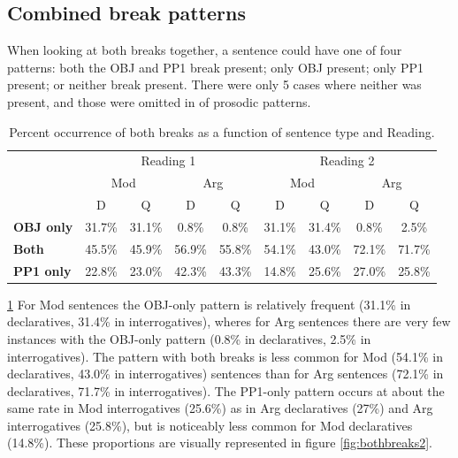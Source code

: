 \documentclass[12pt,oneside]{book}
\begin{document}
\hypertarget{bbr}{%
\subsection{Combined break patterns}\label{bbr}}

When looking at both breaks together, a sentence could have one of four patterns: both the OBJ and PP1 break present; only OBJ present; only PP1 present; or neither break present. There were only 5 cases where neither was present, and those were omitted in  of prosodic patterns.

\begin{table}[!h]

\caption{\label{tab:bothbreaks}Percent occurrence of both breaks as a function of sentence type and Reading.}
\centering
\begin{tabular}{>{\bfseries}lcccccccc}
\toprule
\multicolumn{1}{c}{ } & \multicolumn{4}{c}{Reading 1} & \multicolumn{4}{c}{Reading 2} \\
\cmidrule(l{3pt}r{3pt}){2-5} \cmidrule(l{3pt}r{3pt}){6-9}
\multicolumn{1}{c}{ } & \multicolumn{2}{c}{Mod} & \multicolumn{2}{c}{Arg} & \multicolumn{2}{c}{Mod} & \multicolumn{2}{c}{Arg} \\
\cmidrule(l{3pt}r{3pt}){2-3} \cmidrule(l{3pt}r{3pt}){4-5} \cmidrule(l{3pt}r{3pt}){6-7} \cmidrule(l{3pt}r{3pt}){8-9}
  & D & Q & D & Q & D & Q & D & Q\\
\midrule
OBJ only & 31.7\% & 31.1\% & 0.8\% & 0.8\% & 31.1\% & 31.4\% & 0.8\% & 2.5\%\\
Both & 45.5\% & 45.9\% & 56.9\% & 55.8\% & 54.1\% & 43.0\% & 72.1\% & 71.7\%\\
PP1 only & 22.8\% & 23.0\% & 42.3\% & 43.3\% & 14.8\% & 25.6\% & 27.0\% & 25.8\%\\
\bottomrule
\end{tabular}
\end{table}

 \ref{tab:bothbreaks}   For Mod sentences the OBJ-only pattern is relatively frequent (31.1\% in declaratives, 31.4\% in interrogatives), wheres for Arg sentences there are very few instances with the OBJ-only pattern (0.8\% in declaratives, 2.5\% in interrogatives). The pattern with both breaks is less common for Mod (54.1\% in declaratives, 43.0\% in interrogatives) sentences than for Arg sentences (72.1\% in declaratives, 71.7\% in interrogatives). The PP1-only pattern occurs at about the same rate in Mod interrogatives (25.6\%) as in Arg declaratives (27\%) and Arg interrogatives (25.8\%), but is noticeably less common for Mod declaratives (14.8\%). These proportions are visually represented in figure \ref{fig:bothbreaks2}.
\end{document}
